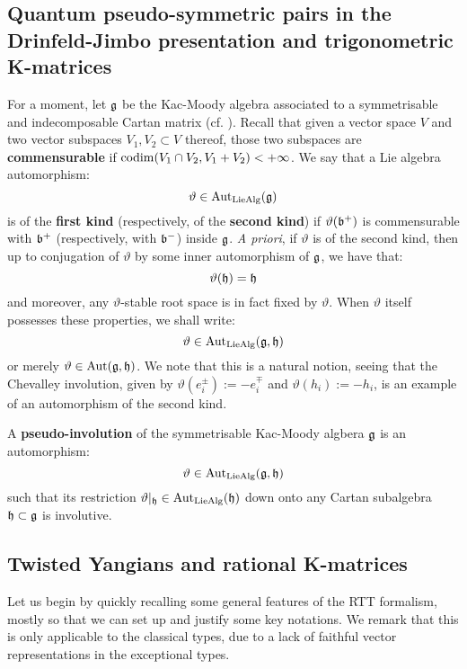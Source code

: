     \subsection{Quantum pseudo-symmetric pairs in the Drinfeld-Jimbo presentation and trigonometric K-matrices}
        For a moment, let $\mathfrak{g}$ be the Kac-Moody algebra associated to a symmetrisable and indecomposable Cartan matrix (cf. \cite[Chapter 1]{kac_infinite_dimensional_lie_algebras}). Recall that given a vector space $V$ and two vector subspaces $V_1, V_2 \subset V$ thereof, those two subspaces are \textbf{commensurable} if $\operatorname{codim}(V_1 \cap V_2, V_1 + V_2) < +\infty$. We say that a Lie algebra automorphism:
            $$\vartheta \in \operatorname{Aut}_{\mathrm{Lie}\mathrm{Alg}}(\mathfrak{g})$$
        is of the \textbf{first kind} (respectively, of the \textbf{second kind}) if $\vartheta(\mathfrak{b}^+)$ is commensurable with $\mathfrak{b}^+$ (respectively, with $\mathfrak{b}^-$) inside $\mathfrak{g}$. \textit{A priori}, if $\vartheta$ is of the second kind, then up to conjugation of $\vartheta$ by some inner automorphism of $\mathfrak{g}$, we have that:
            $$\vartheta(\mathfrak{h}) = \mathfrak{h}$$
        and moreover, any $\vartheta$-stable root space is in fact fixed by $\vartheta$. When $\vartheta$ itself possesses these properties, we shall write:
            $$\vartheta \in \operatorname{Aut}_{\mathrm{Lie}\mathrm{Alg}}(\mathfrak{g}, \mathfrak{h})$$
        or merely $\vartheta \in \operatorname{Aut}(\mathfrak{g}, \mathfrak{h})$. We note that this is a natural notion, seeing that the Chevalley involution, given by $\vartheta(e_i^{\pm}) := -e_i^{\mp}$ and $\vartheta(h_i) := -h_i$, is an example of an automorphism of the second kind. 
        \begin{definition} \label{def: pseudo_involutions}
            A \textbf{pseudo-involution} of the symmetrisable Kac-Moody algbera $\mathfrak{g}$ is an automorphism:
                $$\vartheta \in \operatorname{Aut}_{\mathrm{Lie}\mathrm{Alg}}(\mathfrak{g}, \mathfrak{h})$$
            such that its restriction $\vartheta|_{\mathfrak{h}} \in \operatorname{Aut}_{\mathrm{Lie}\mathrm{Alg}}(\mathfrak{h})$ down onto any Cartan subalgebra $\mathfrak{h} \subset \mathfrak{g}$ is involutive. 
        \end{definition}

    \subsection{Twisted Yangians and rational K-matrices}
        Let us begin by quickly recalling some general features of the RTT formalism, mostly so that we can set up and justify some key notations. We remark that this is only applicable to the classical types, due to a lack of faithful vector representations in the exceptional types.
            
